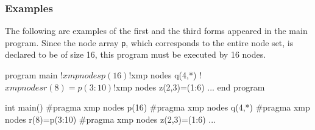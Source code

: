 \subsubsection*{Examples}

The following are examples of the first and the third forms appeared in
the main program. Since the node array {\tt p}, which corresponds to the
entire node set, is declared to be of size 16, this program must be
executed by 16 nodes.



\vspace{0.5cm}

\begin{minipage}{0.45\hsize}
\begin{center}
\begin{XFexample}
      program main
!$xmp nodes p(16)
!$xmp nodes q(4,*)
!$xmp nodes r(8)=p(3:10)
!$xmp nodes z(2,3)=(1:6)
      ...       
      end program 
\end{XFexample}
\end{center}
\end{minipage}
%
\begin{minipage}{0.45\hsize}
\begin{center}
\begin{XCexampleR}
int main() {
#pragma xmp nodes p(16)
#pragma xmp nodes q(4,*)
#pragma xmp nodes r(8)=p(3:10)
#pragma xmp nodes z(2,3)=(1:6)
    ...
}
\end{XCexampleR}
\end{center}
\end{minipage}

\vspace{0.5cm}

%


